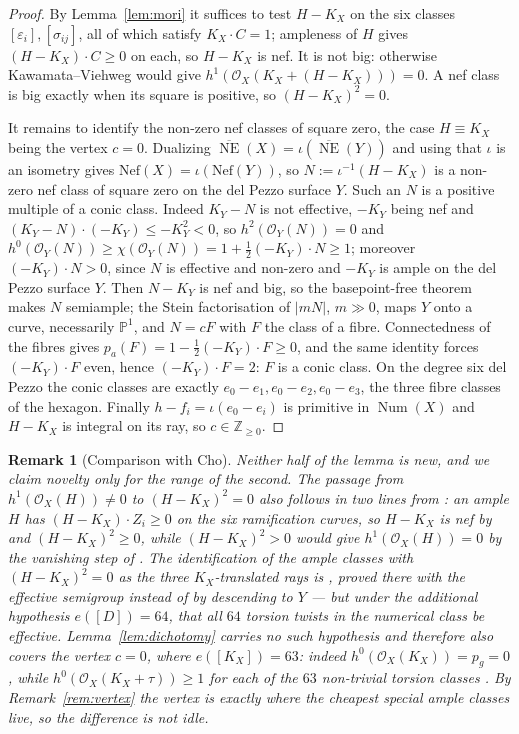 \documentclass[10pt,a4paper]{amsart}
\newtheorem{remark}[theorem]{Remark}
\newcommand{\OO}{\mathcal{O}}
\newcommand{\PP}{\mathbb{P}}
\newcommand{\ZZ}{\mathbb{Z}}
\newcommand{\Num}{\operatorname{Num}}
\newcommand{\NE}{\overline{\operatorname{NE}}}
\begin{document}
\begin{proof}
By Lemma~\ref{lem:mori} it suffices to test $H-K_X$ on the six classes $[\varepsilon_i],[\sigma_{ij}]$, all of which satisfy $K_X\cdot C=1$; ampleness of $H$ gives $(H-K_X)\cdot C\ge0$ on each, so $H-K_X$ is nef. It is not big: otherwise Kawamata--Viehweg would give $h^1(\OO_X(K_X+(H-K_X)))=0$. A nef class is big exactly when its square is positive, so $(H-K_X)^2=0$.

It remains to identify the non-zero nef classes of square zero, the case $H\equiv K_X$ being the vertex $c=0$. Dualizing $\NE(X)=\iota(\NE(Y))$ and using that $\iota$ is an isometry gives $\mathrm{Nef}(X)=\iota(\mathrm{Nef}(Y))$, so $N:=\iota^{-1}(H-K_X)$ is a non-zero nef class of square zero on the del Pezzo surface $Y$. Such an $N$ is a positive multiple of a conic class. Indeed $K_Y-N$ is not effective, $-K_Y$ being nef and $(K_Y-N)\cdot(-K_Y)\le-K_Y^2<0$, so $h^2(\OO_Y(N))=0$ and $h^0(\OO_Y(N))\ge\chi(\OO_Y(N))=1+\tfrac12(-K_Y)\cdot N\ge1$; moreover $(-K_Y)\cdot N>0$, since $N$ is effective and non-zero and $-K_Y$ is ample on the del Pezzo surface $Y$. Then $N-K_Y$ is nef and big, so the basepoint-free theorem makes $N$ semiample; the Stein factorisation of $|mN|$, $m\gg0$, maps $Y$ onto a curve, necessarily $\PP^1$, and $N=cF$ with $F$ the class of a fibre. Connectedness of the fibres gives $p_a(F)=1-\tfrac12(-K_Y)\cdot F\ge0$, and the same identity forces $(-K_Y)\cdot F$ even, hence $(-K_Y)\cdot F=2$: $F$ is a conic class. On the degree six del Pezzo the conic classes are exactly $e_0-e_1,e_0-e_2,e_0-e_3$, the three fibre classes of the hexagon. Finally $h-f_i=\iota(e_0-e_i)$ is primitive in $\Num(X)$ and $H-K_X$ is integral on its ray, so $c\in\ZZ_{\ge0}$.
\end{proof}

\begin{remark}[Comparison with Cho]\label{rem:dichotomy-cho}
Neither half of the lemma is new, and we claim novelty only for the range of the second. The passage from $h^1(\OO_X(H))\neq0$ to $(H-K_X)^2=0$ also follows in two lines from \cite{Cho26}: an ample $H$ has $(H-K_X)\cdot Z_i\ge0$ on the six ramification curves, so $H-K_X$ is nef by \cite[Prop.~4.2]{Cho26} and $(H-K_X)^2\ge0$, while $(H-K_X)^2>0$ would give $h^1(\OO_X(H))=0$ by the vanishing step of \cite[Algorithm~4.18(3.1)]{Cho26}. The identification of the ample classes with $(H-K_X)^2=0$ as the three $K_X$-translated rays is \cite[Prop.~4.10]{Cho26}, proved there with the effective semigroup instead of by descending to $Y$ --- but under the additional hypothesis $e([D])=64$, that all $64$ torsion twists in the numerical class be effective. Lemma~\ref{lem:dichotomy} carries no such hypothesis and therefore also covers the vertex $c=0$, where $e([K_X])=63$: indeed $h^0(\OO_X(K_X))=p_g=0$, while $h^0(\OO_X(K_X+\tau))\ge1$ for each of the $63$ non-trivial torsion classes \cite[\S4.2]{Cho26}. By Remark~\ref{rem:vertex} the vertex is exactly where the cheapest special ample classes live, so the difference is not idle.
\end{remark}
\end{document}
